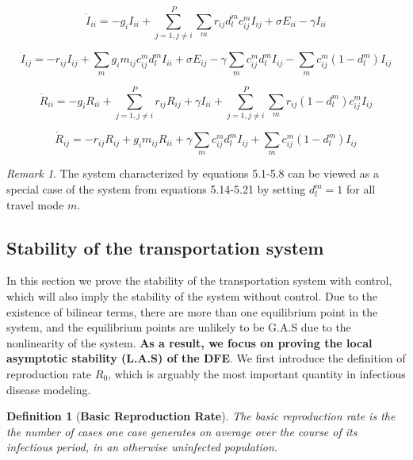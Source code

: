 \documentclass[review]{elsarticle}
\theoremstyle{plain}
\newtheorem{defn}{Definition}[section]
\theoremstyle{definition}
\theoremstyle{remark}
\numberwithin{equation}{section}
\newtheorem{remark}[theorem]{Remark}
\theoremstyle{remark}
\begin{document}
\begin{equation}
	\dot{I}_{ii}=-g_{i}I_{ii}+\sum_{j=1,j\neq i}^{P}\sum_m r_{ij}d_l^mc_{ij}^mI_{ij}+\sigma E_{ii}-\gamma I_{ii}
\end{equation} 

\begin{equation}
	\dot{I}_{ij}=-r_{ij}I_{ij}+\sum_m g_i m_{ij} c_{ij}^m d_l^m I_{ii}+\sigma E_{ij}-\gamma \sum_m c_{ij}^md_l^mI_{ij}-\sum_m c_{ij}^m(1-d_l^m) I_{ij}
\end{equation}

\begin{equation}
	\dot{R}_{ii}=-g_{i}R_{ii}+\sum_{j=1,j\neq i}^{P}r_{ij}R_{ij}+\gamma I_{ii}+\sum_{j=1,j\neq i}^{P}\sum_m r_{ij}(1-d_l^m)c_{ij}^mI_{ij}
\end{equation}

\begin{equation}
	\dot{R}_{ij}=-r_{ij}R_{ij}+g_i m_{ij}R_{ii}+\gamma \sum_m c_{ij}^md_l^mI_{ij}+\sum_m c_{ij}^m (1-d_l^m) I_{ij}
\end{equation}

\begin{remark}
 The system characterized by equations 5.1-5.8 can be viewed as a special case of the system from equations 5.14-5.21 by setting $d_l^m=1$ for all travel mode $m$.  
\end{remark}

\subsection{Stability of the transportation system}
In this section we prove the stability of the transportation system with control, which will also imply the stability of the system without control. Due to the existence of bilinear terms, there are more than one equilibrium point in the system, and the equilibrium points are unlikely to be G.A.S due to the nonlinearity of the system. \textbf{As a result, we focus on proving the local asymptotic stability (L.A.S) of the DFE}. We first introduce the definition of reproduction rate $R_0$, which is arguably the most important quantity in infectious disease modeling.

\begin{defn} [\textbf{Basic Reproduction Rate}]
	The basic reproduction rate is the the number of cases one case generates on average over the course of its infectious period, in an otherwise uninfected population. 
\end{defn}
\end{document}
